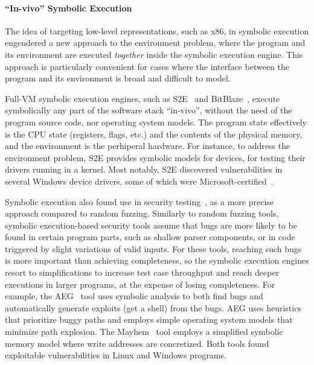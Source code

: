 \paragraph{``In-vivo'' Symbolic Execution}

The idea of targeting low-level representations, such as x86, in symbolic execution engendered a new approach to the environment problem, where the program and its environment are executed \emph{together} inside the symbolic execution engine.
%
%
This approach is particularly convenient for cases where the interface between the program and its environment is broad and difficult to model.

Full-VM symbolic execution engines, such as S2E~\cite{s2eSystem} and BitBlaze~\cite{bitBlaze}, execute symbolically any part of the software stack ``in-vivo'', without the need of the program source code, nor operating system models.
%
The program state effectively is the CPU state (registers, flags, etc.) and the contents of the physical memory, and the environment is the perhiperal hardware.
%
For instance, to address the environment problem, S2E provides symbolic models for devices, for testing their drivers running in a kernel.
%
Most notably, S2E discovered vulnerabilities in several Windows device drivers, some of which were Microsoft-certified~\cite{ddt}.

Symbolic execution also found use in security testing~\cite{aeg,mayhem,bitBlaze}, as a more precise approach compared to random fuzzing.
%
Similarly to random fuzzing tools, symbolic execution-based security tools assume that bugs are more likely to be found in certain program parts, such as shallow parser components, or in code triggered by slight variations of valid inputs.
%
For these tools, reaching such bugs is more important than achieving completeness, so the symbolic execution engines resort to simplifications to increase test case throughput and reach deeper executions in larger programs, at the expense of losing completeness.
%
For example, the AEG~\cite{aeg} tool uses symbolic analysis to both find bugs and automatically generate exploits (get a shell) from the bugs.  AEG uses heuristics that prioritize buggy paths and employs simple operating system models that minimize path explosion.
%
The Mayhem~\cite{mayhem} tool employs a simplified symbolic memory model where write addresses are concretized.
%
Both tools found exploitable vulnerabilities in Linux and Windows programs.



